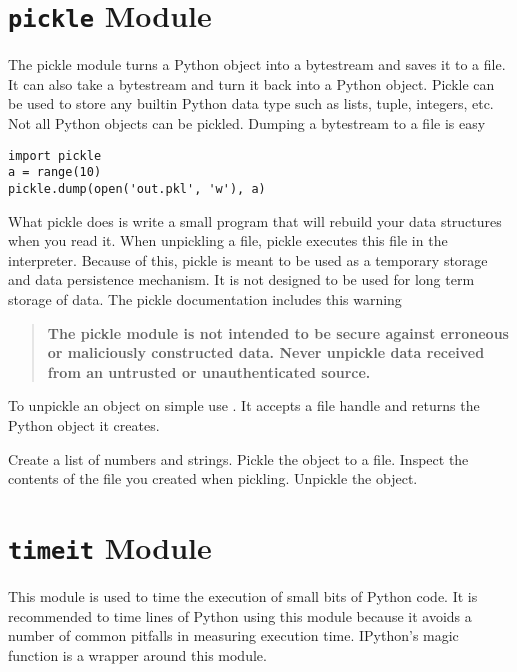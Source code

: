 \section*{\texttt{pickle} Module}
The pickle module turns a Python object into a bytestream and saves it to a file.
It can also take a bytestream and turn it back into a Python object.
Pickle can be used to store any builtin Python data type such as lists, tuple, integers, etc.
Not all Python objects can be pickled.
Dumping a bytestream to a file is easy
\begin{lstlisting}
import pickle
a = range(10)
pickle.dump(open('out.pkl', 'w'), a)
\end{lstlisting}
What pickle does is write a small program that will rebuild your data structures when you read it.
When unpickling a file, pickle executes this file in the interpreter.  Because of this,
pickle is meant to be used as a temporary storage and data persistence mechanism.  It is not designed
to be used for long term storage of data.  The pickle documentation includes this warning
\begin{quote}
\textbf{The pickle module is not intended to be secure against erroneous or maliciously constructed data. Never unpickle data received from an untrusted or unauthenticated source.}
\end{quote}
To unpickle an object on simple use .  It accepts a file handle and returns the Python object it creates.

\begin{problem}
Create a list of numbers and strings.  Pickle the object to a file.  Inspect the contents of the file you created when pickling.  Unpickle the object.
\end{problem}

\section*{\texttt{timeit} Module}
This module is used to time the execution of small bits of Python code.
It is recommended to time lines of Python using this module because it avoids a number of common pitfalls in measuring execution time.  IPython's  magic function is a wrapper around this module.  

